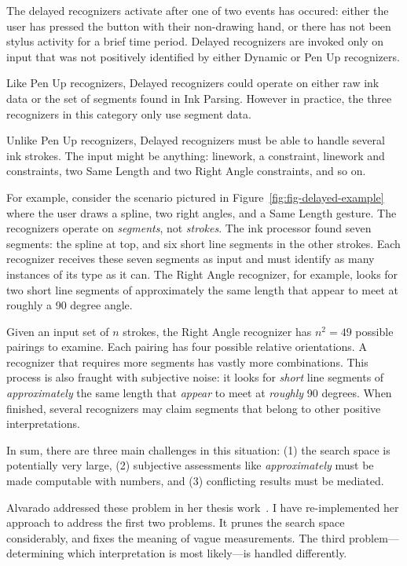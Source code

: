 The delayed recognizers activate after one of two events has occured:
either the user has pressed the button with their non-drawing hand, or
there has not been stylus activity for a brief time period. Delayed
recognizers are invoked only on input that was not positively
identified by either Dynamic or Pen Up recognizers.

Like Pen Up recognizers, Delayed recognizers could operate on either
raw ink data or the set of segments found in Ink Parsing. However in
practice, the three recognizers in this category only use segment
data.

Unlike Pen Up recognizers, Delayed recognizers must be able to handle
several ink strokes. The input might be anything: linework, a
constraint, linework and constraints, two Same Length and two Right
Angle constraints, and so on. 



For example, consider the scenario pictured in
Figure~\ref{fig:fig-delayed-example} where the user draws a spline,
two right angles, and a Same Length gesture. The recognizers operate
on \textit{segments}, not \textit{strokes}. The ink processor found
seven segments: the spline at top, and six short line segments in the
other strokes. Each recognizer receives these seven segments as input
and must identify as many instances of its type as it can. The Right
Angle recognizer, for example, looks for two short line segments of
approximately the same length that appear to meet at roughly a 90
degree angle. 

Given an input set of $n$ strokes, the Right Angle recognizer has
$n^2=49$ possible pairings to examine. Each pairing has four possible
relative orientations. A recognizer that requires more segments has
vastly more combinations. This process is also fraught with subjective
noise: it looks for \textit{short} line segments of
\textit{approximately} the same length that \textit{appear} to meet at
\textit{roughly} 90 degrees. When finished, several recognizers may
claim segments that belong to other positive interpretations.

In sum, there are three main challenges in this situation: (1) the
search space is potentially very large, (2) subjective assessments
like \textit{approximately} must be made computable with numbers, and
(3) conflicting results must be mediated.

Alvarado addressed these problem in her thesis
work~\cite[Ch. 4]{alvarado-phd-thesis}. I have re-implemented her
approach to address the first two problems. It prunes the search space
considerably, and fixes the meaning of vague measurements. The third
problem---determining which interpretation is most likely---is handled
differently.

